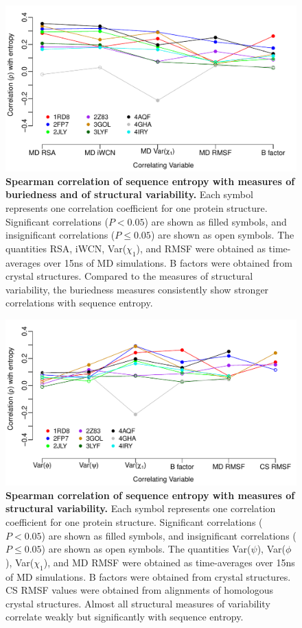 \documentclass[12pt]{article}
\begin{document}
\begin{figure}[tbh]
\begin{center}
    \includegraphics[width=5in]{cor_entropy_all.pdf}
\end{center}
\caption{\textbf{Spearman correlation of sequence entropy with measures of buriedness and of structural variability.} Each symbol represents one correlation coefficient for one protein structure. Significant correlations ($P<0.05$) are shown as filled symbols, and insignificant correlations ($P\leq0.05$) are shown as open symbols. The quantities RSA, iWCN, Var($\chi_1$), and RMSF were obtained as time-averages over 15ns of MD simulations. B factors were obtained from crystal structures. Compared to the measures of structural variability, the buriedness measures consistently show stronger correlations with sequence entropy.}
\label{fig:cor_entropy_all}
\end{figure}


\begin{figure}[tbh]
\begin{center}
    \includegraphics[width=5in]{cor_entropy_SF.pdf}
\end{center}
\caption{\textbf{Spearman correlation of sequence entropy with measures of structural variability.} Each symbol represents one correlation coefficient for one protein structure. Significant correlations ($P<0.05$) are shown as filled symbols, and insignificant correlations ($P\leq0.05$) are shown as open symbols. The quantities Var($\psi$), Var($\phi$), Var($\chi_1$), and MD RMSF were obtained as time-averages over 15ns of MD simulations. B factors were obtained from crystal structures. CS RMSF values were obtained from alignments of homologous crystal structures. Almost all structural measures of variability correlate weakly but significantly with sequence entropy.}
\label{fig:cor_entropy_SF}
\end{figure}
\end{document}
